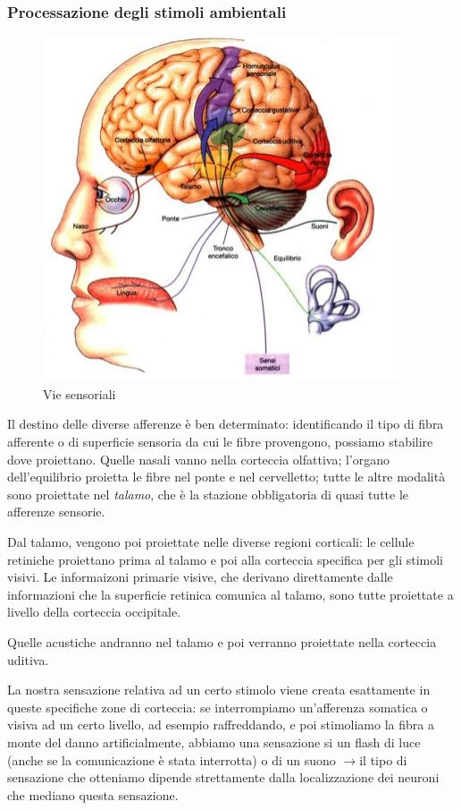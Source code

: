 \documentclass[a4paper,12pt]{article}
\newcommand{\lfreccia}{\ensuremath{\longrightarrow}}
\begin{document}
\subsubsection{Processazione degli stimoli ambientali}

\begin{figure}[H]
\centering
\includegraphics[scale=0.5]{immagine/corteccia.jpg}
\caption{Vie sensoriali}
\end{figure}

Il destino delle diverse afferenze è ben determinato: identificando il tipo di fibra afferente o di superficie sensoria da cui le fibre provengono, possiamo stabilire dove proiettano. Quelle nasali vanno nella corteccia olfattiva; l'organo dell'equilibrio proietta le fibre nel ponte e nel cervelletto; tutte le altre modalità sono proiettate nel \emph{talamo}, che è la stazione obbligatoria di quasi tutte le afferenze sensorie. 

Dal talamo, vengono poi proiettate nelle diverse regioni corticali: le cellule retiniche proiettano prima al talamo e poi alla corteccia specifica per gli stimoli visivi. Le informaizoni primarie visive, che derivano direttamente dalle informazioni che la superficie retinica comunica al talamo, sono tutte proiettate a livello della corteccia occipitale.

Quelle acustiche andranno nel talamo e poi verranno proiettate nella corteccia uditiva.

La nostra sensazione relativa ad un certo stimolo viene creata esattamente in queste specifiche zone di corteccia: se interrompiamo un'afferenza somatica o visiva ad un certo livello, ad esempio raffreddando, e poi stimoliamo la fibra a monte del danno artificialmente, abbiamo una sensazione si un flash di luce (anche se la comunicazione è stata interrotta) o di un suono \lfreccia il tipo di sensazione che otteniamo dipende strettamente dalla localizzazione dei neuroni che mediano questa sensazione.
\end{document}

